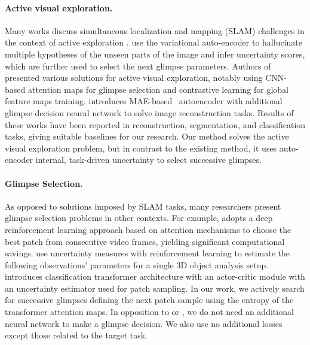 \documentclass{article}
\begin{document}
\paragraph{Active visual exploration.} 
Many works discuss simultaneous localization and mapping (SLAM) challenges in the context of active exploration \cite{Ramakrishnan2021AnEO}. \cite{samrudhdhi2021vae1} use the variational auto-encoder to hallucinate multiple hypotheses of the unseen parts of the image and infer uncertainty scores, which are further used to select the next glimpse parameters. Authors of~\cite{seifi2021glimpse,seifi2020segment,seifi2019wheretolooknext} presented various solutions for active visual exploration, notably using CNN-based attention maps for glimpse selection and contrastive learning for global feature maps training. \cite{Jha2023WACV} introduces MAE-based~\cite{he2022masked} autoencoder with additional glimpse decision neural network to solve image reconstruction tasks. Results of these works have been reported in reconstruction, segmentation, and classification tasks, giving suitable baselines for our research. Our method solves the active visual exploration problem, but in contrast to the existing method, it uses auto-encoder internal, task-driven uncertainty to select successive glimpses.

\paragraph{Glimpse Selection.} 
As opposed to solutions imposed by SLAM tasks, many researchers present glimpse selection problems in other contexts. For example, \cite{chai2019rl2} adopts a deep reinforcement learning approach based on attention mechanisms to choose the best patch from consecutive video frames, yielding significant computational savings. \cite{jayaraman2017rl1} use uncertainty measures with reinforcement learning to estimate the following observations' parameters for a single 3D object analysis setup. \cite{rangrej2022consistency} introduces classification transformer architecture with an actor-critic module with an uncertainty estimator used for patch sampling. In our work, we actively search for successive glimpses defining the next patch sample using the entropy of the transformer attention maps. In opposition to \cite{rangrej2022consistency} or \cite{Jha2023WACV}, we do not need an additional neural network to make a glimpse decision. We also use no additional losses except those related to the target task.

\end{document}
